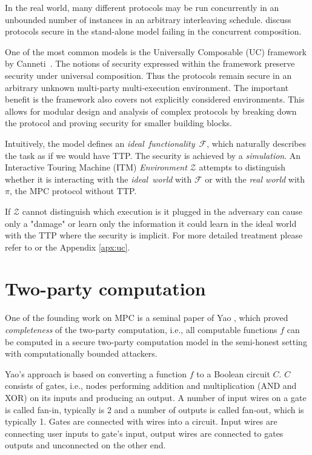 \documentclass[
  digital, %
  twoside, %
  table,   %
  lof,     %
  lot,     %
]{fithesis3}
\newcounter{ph4_show_guides}
\theoremstyle{definition}
\theoremstyle{remark}
\begin{document}
In the real world, many different protocols may be run concurrently in an unbounded number of instances in an arbitrary interleaving schedule. \cite{Can06, Can13} discuss protocols secure in the stand-alone model failing in the concurrent composition.

One of the most common models is the Universally Composable (UC) framework by Canneti~\cite{Can01}. The notions of security expressed within the framework preserve security under universal composition. Thus the protocols remain secure in an arbitrary unknown multi-party multi-execution environment. The important benefit is the framework also covers not explicitly considered environments. This allows for modular design and analysis of complex protocols by breaking down the protocol and proving security for smaller building blocks.

Intuitively, the model defines an \emph{ideal~functionality}~$\mathcal{F}$, which naturally describes the task as if we would have TTP. The security is achieved by a \emph{simulation}. An Interactive Touring Machine (ITM) \emph{Environment} $\mathcal{Z}$ attempts to distinguish whether it is interacting with the \emph{ideal~world} with $\mathcal{F}$ or with the \emph{real world} with $\pi$, the MPC protocol without TTP. 

If $\mathcal{Z}$ cannot distinguish which execution is it plugged in the adversary can cause only a "damage" or learn only the information it could learn in the ideal world with the TTP where the security is implicit. For more detailed treatment please refer to \cite{Can01, CLOS02, Lin03, G09, CDN15, Lin17} or the Appendix \ref{apx:uc}.

\section{Two-party computation}\label{sec:soa:2pc} %
One of the founding work on MPC is a seminal paper of Yao \cite{Yao86}, which proved \emph{completeness} of the two-party computation, i.e., all computable functions $f$ can be computed in a secure two-party computation model in the semi-honest setting with computationally bounded attackers. 

Yao's approach is based on converting a function $f$ to a Boolean circuit $C$. $C$ consists of gates, i.e., nodes performing addition and multiplication (AND and XOR) on its inputs and producing an output. A number of input wires on a gate is called fan-in, typically is 2 and a number of outputs is called fan-out, which is typically 1. Gates are connected with wires into a circuit. Input wires are connecting user inputs to gate's input, output wires are connected to gates outputs and unconnected on the other end.
\end{document}
